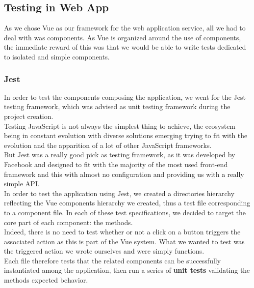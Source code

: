 \documentclass{eplmastersthesis}
\begin{document}
      \subsection{Testing in Web App}

        As we chose Vue as our framework for the web application service,
        all we had to deal with was components. As Vue is organized around
        the use of components, the immediate reward of this was that we would
        be able to write tests dedicated to isolated and simple components.

        \subsubsection{Jest}

          In order to test the components composing the application, we
          went for the Jest \cite{jest} testing framework, which was advised
          as unit testing framework during the project creation.\\

          Testing JavaScript is not always the simplest thing to achieve, the
          ecosystem being in constant evolution with diverse solutions emerging
          trying to fit with the evolution and the apparition of a lot of
          other JavaScript frameworks.\\
          But Jest was a really good pick as testing framework, as it was
          developed by Facebook and designed to fit with the majority of the
          most used front-end framework and this with almost no configuration and
          providing us with a really simple API.\\

          In order to test the application using Jest, we created a directories
          hierarchy reflecting the Vue components hierarchy we created, thus
          a test file corresponding to a component file. In each of these
          test specifications, we decided to target the core part of each
          component: the methods.\\
          Indeed, there is no need to test whether or not a click on a button
          triggers the associated action as this is part of the Vue system. What
          we wanted to test was the triggered action we wrote ourselves and
          were simply functions.\\
          Each file therefore tests that the related components can be
          successfully instantiated among the application, then run a series
          of \textbf{unit tests} validating the methods expected behavior.
\end{document}
